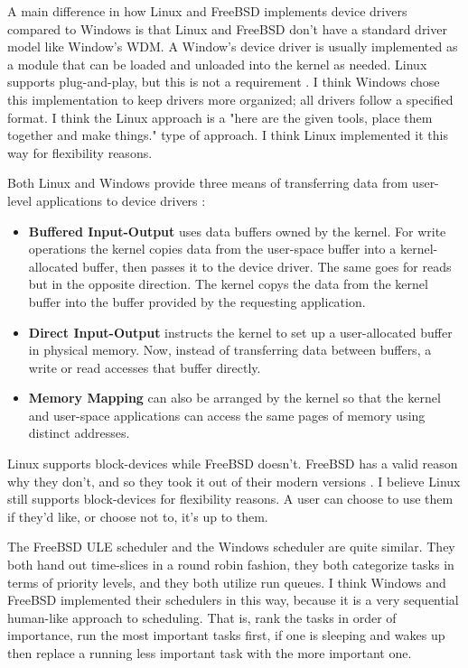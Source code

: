 \documentclass[onecolumn,draftclsnofoot, 10pt, compsoc]{IEEEtran}
\begin{document}
		A main difference in how Linux and FreeBSD implements device drivers compared to Windows is that Linux and FreeBSD don't have a standard driver model like Window's WDM. A Window's device driver is usually implemented as a module that can be loaded and unloaded into the kernel as needed. Linux supports plug-and-play, but this is not a requirement \cite{windowsDevs}. I think Windows chose this implementation to keep drivers more organized; all drivers follow a specified format. I think the Linux approach is a "here are the given tools, place them together and make things." type of approach. I think Linux implemented it this way for flexibility reasons. 
	
		Both Linux and Windows provide three means of transferring data from user-level applications to device drivers  \cite{windowsDevs}:
		\begin{itemize}
			\item \textbf{Buffered Input-Output} uses data buffers owned by the kernel. For write operations the kernel copies data from the user-space buffer into a kernel-allocated buffer, then passes it to the device driver. The same goes for reads but in the opposite direction. The kernel copys the data from the kernel buffer into the buffer provided by the requesting application.
			\item \textbf{Direct Input-Output} instructs the kernel to set up a user-allocated buffer in physical memory. Now, instead of transferring data between buffers, a write or read accesses that buffer directly.
			\item \textbf{Memory Mapping} can also be arranged by the kernel so that the kernel and user-space applications can access the same pages of memory using distinct addresses.
		\end{itemize}
	
		Linux supports block-devices while FreeBSD doesn't. 
		FreeBSD has a valid reason why they don't, and so they took it out of their modern versions \cite{freeBSDSmall}.
		I believe Linux still supports block-devices for flexibility reasons.
		A user can choose to use them if they'd like, or choose not to, it's up to them.
		
		The FreeBSD ULE scheduler and the Windows scheduler are quite similar.
		They both hand out time-slices in a round robin fashion, they both categorize tasks in terms of priority levels, and they both utilize run queues.
		I think Windows and FreeBSD implemented their schedulers in this way, because it is a very sequential human-like approach to scheduling. That is, rank the tasks in order of importance, run the most important tasks first, if one is sleeping and wakes up then replace a running less important task with the more important one.
	
\end{document}
